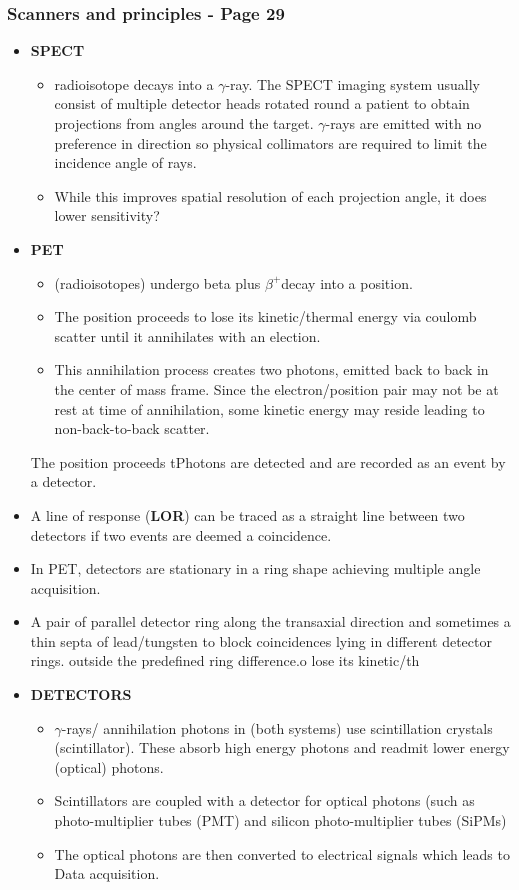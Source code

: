 \documentclass{article}
\begin{document}
\subsubsection{Scanners and principles - Page 29}
\begin{itemize}
\item \textbf{SPECT}  
\begin{itemize}
\item radioisotope decays into a $\gamma$-ray. The SPECT imaging system usually consist of multiple detector heads rotated round a patient to obtain projections from angles around the target. $\gamma$-rays are emitted with no preference in direction so physical collimators are required to limit the incidence angle of rays. 
\item While this improves spatial resolution of each projection angle, {\color{red}it does lower sensitivity?} 
\end{itemize}

\item \textbf{PET} 
\begin{itemize}
\item (radioisotopes) undergo beta plus $\beta ^+$decay into a position. 
\item The position proceeds to lose its kinetic/thermal energy via coulomb scatter until it annihilates with an election. 
\item This annihilation process creates two photons, emitted back to back in the center of mass frame. Since the electron/position pair may not be at rest at time of annihilation, some kinetic energy may reside leading to non-back-to-back scatter. 
\end{itemize}The position proceeds tPhotons are detected and are recorded as an event by a detector. 
\item A line of response (\textbf{LOR}) can be traced as a straight line between two detectors if two events are deemed a coincidence.
\item In PET, detectors are stationary in a ring shape achieving multiple angle acquisition.
\item A pair of parallel detector ring along the transaxial direction and sometimes a thin septa of lead/tungsten to block coincidences lying in different detector rings. outside the predefined ring difference.o lose its kinetic/th

\item \textbf{DETECTORS}
\begin{itemize}
\item $\gamma$-rays/ annihilation photons in (both systems) use scintillation crystals (scintillator). These absorb high energy photons and readmit lower energy (optical) photons.
\item Scintillators are coupled with a detector for optical photons (such as photo-multiplier tubes (PMT) and silicon photo-multiplier tubes (SiPMs)
\item The optical photons are then converted to electrical signals which leads to Data acquisition.
\end{itemize}
\end{itemize}
\end{document}
